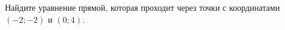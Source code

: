 \begin{ex}
	\begin{condition}
		Найдите уравнение прямой, которая проходит через точки с координатами \( (-2;-2) \) и \( (0;4) \).
	\end{condition}
\end{ex}